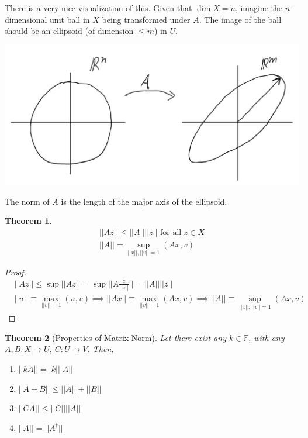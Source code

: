 \documentclass{article}
\newtheorem{theorem}{Theorem}[section]
\theoremstyle{remark}
\theoremstyle{definition}
\begin{document}
There is a very nice visualization of this. Given that $\dim{X}=n$, imagine the $n$-dimensional unit ball in $X$ being transformed under $A$. The image of the ball should be an ellipsoid (of dimension $\leq m$) in $U$. 
\begin{center}
    \includegraphics[scale=0.4]{img/Matrix_Norm_Visualization.png}
\end{center}
The norm of $A$ is the length of the major axis of the ellipsoid. 

\begin{theorem}
\begin{align}
    ||A z|| \leq ||A|| ||z|| \text{ for all } z \in X \\
    ||A|| = \sup_{||x||, ||v|| = 1} (A x, v)
\end{align}
\end{theorem}
\begin{proof}
\begin{align*}
    &||A z|| \leq \sup{||A z||} = \sup{\Big|\Big| A \frac{z}{||z||} \Big|\Big|} = ||A|| ||z|| \\
    &||u|| \equiv \max_{||v||=1} (u, v) \implies ||A x|| \equiv \max_{||v||=1} (Ax, v) \implies ||A|| \equiv \sup_{||x||, ||v|| =1} (A x, v)
\end{align*}
\end{proof}

\begin{theorem}[Properties of Matrix Norm]
Let there exist any $k \in \mathbb{F}$, with any $A, B: X \longrightarrow U$, $C: U \longrightarrow V$. Then, 
\begin{enumerate}
    \item $||k A|| = |k| ||A||$
    \item $||A + B|| \leq ||A|| + ||B||$
    \item $||C A|| \leq ||C|| ||A||$
    \item $||A|| = ||A^\dagger||$
\end{enumerate}
\end{theorem}
\end{document}
